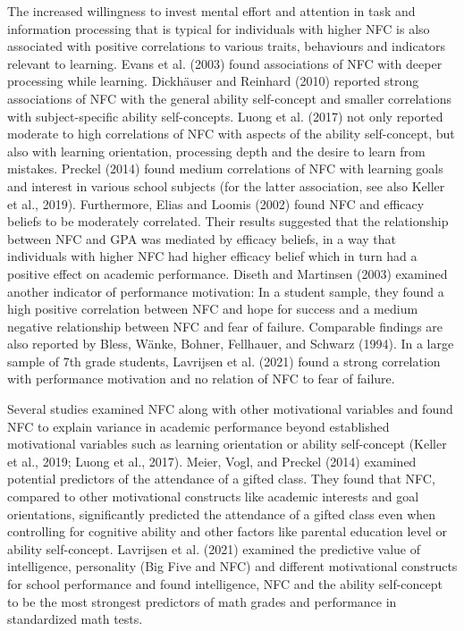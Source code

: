\documentclass[
  man]{apa6}
\begin{document}
The increased willingness to invest mental effort and attention in task and information processing that is typical for individuals with higher NFC is also associated with positive correlations to various traits, behaviours and indicators relevant to learning. Evans et al. (2003) found associations of NFC with deeper processing while learning. Dickhäuser and Reinhard (2010) reported strong associations of NFC with the general ability self-concept and smaller correlations with subject-specific ability self-concepts. Luong et al. (2017) not only reported moderate to high correlations of NFC with aspects of the ability self-concept, but also with learning orientation, processing depth and the desire to learn from mistakes. Preckel (2014) found medium correlations of NFC with learning goals and interest in various school subjects (for the latter association, see also Keller et al., 2019). Furthermore, Elias and Loomis (2002) found NFC and efficacy beliefs to be moderately correlated. Their results suggested that the relationship between NFC and GPA was mediated by efficacy beliefs, in a way that individuals with higher NFC had higher efficacy belief which in turn had a positive effect on academic performance. Diseth and Martinsen (2003) examined another indicator of performance motivation: In a student sample, they found a high positive correlation between NFC and hope for success and a medium negative relationship between NFC and fear of failure. Comparable findings are also reported by Bless, Wänke, Bohner, Fellhauer, and Schwarz (1994). In a large sample of 7th grade students, Lavrijsen et al. (2021) found a strong correlation with performance motivation and no relation of NFC to fear of failure.

Several studies examined NFC along with other motivational variables and found NFC to explain variance in academic performance beyond established motivational variables such as learning orientation or ability self-concept (Keller et al., 2019; Luong et al., 2017). Meier, Vogl, and Preckel (2014) examined potential predictors of the attendance of a gifted class. They found that NFC, compared to other motivational constructs like academic interests and goal orientations, significantly predicted the attendance of a gifted class even when controlling for cognitive ability and other factors like parental education level or ability self-concept. Lavrijsen et al. (2021) examined the predictive value of intelligence, personality (Big Five and NFC) and different motivational constructs for school performance and found intelligence, NFC and the ability self-concept to be the most strongest predictors of math grades and performance in standardized math tests.
\end{document}
